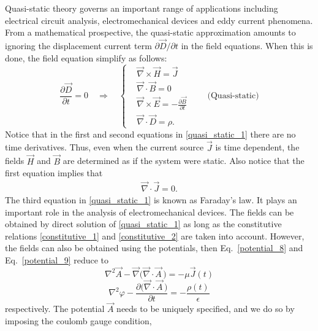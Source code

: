 \documentclass[11pt,a4paper,oneside]{book}
\numberwithin{equation}{section}
\theoremstyle{it}
\theoremstyle{definition}
\begin{document}
Quasi-static theory governs an important range of applications including electrical circuit analysis, electromechanical devices and eddy current phenomena. From a mathematical prospective, the quasi-static approximation amounts to ignoring the displacement current term $\partial \vec{D}/\partial t$ in the field equations. When this is done, the field equation simplify as follows:
\begin{equation}\label{quasi_static_1}
	\frac{\partial\vec{D}}{\partial t} = 0\quad\Rightarrow\quad\left\lbrace 
	\begin{aligned}
		&\vec{\nabla}\times\vec{H}=\vec{J}\\[8pt]
		&\vec{\nabla}\cdot\vec{B}=0\\[8pt]
		&\vec{\nabla}\times\vec{E}=-\frac{\partial\vec{B}}{\partial t}\\[8pt]
		&\vec{\nabla}\cdot\vec{D}=\rho.
	\end{aligned}\right. \qquad\text{(Quasi-static)}
\end{equation}
Notice that in the first and second equations in \ref{quasi_static_1} there are no time derivatives. Thus, even when the current source $\vec{J}$ is time dependent, the fields $\vec{H}$ and $\vec{B}$ are determined as if the system were static. Also notice that the first equation implies that
\begin{equation*}\label{}
	\begin{aligned}
		\vec{\nabla}\cdot\vec{J}=0.
	\end{aligned}
\end{equation*}
The third equation in \ref{quasi_static_1} is known as Faraday's law. It plays an important role in the analysis of electromechanical devices. The fields can be obtained by direct solution of \ref{quasi_static_1} as long as the constitutive relations \ref{constitutive_1} and \ref{constitutive_2} are taken into account. However, the fields can also be obtained using the potentials, then Eq.~\eqref{potential_8} and Eq.~\eqref{potential_9} reduce to 
\begin{equation}\label{quasi_static_2}
	\nabla^2\vec{A} - \vec{\nabla}\big(\vec{\nabla}\cdot\vec{A}\,\big) = -\mu\vec{J}(t)
\end{equation}
\begin{equation}\label{quasi_static_3}
	\nabla^2\varphi - \frac{\partial \big(\vec{\nabla}\cdot\vec{A}\,\big)}{\partial t} = -\frac{\rho(t)}{\epsilon}
\end{equation}
respectively. The potential $\vec{A}$ needs to be uniquely specified, and we do so by imposing the coulomb gauge condition,
\end{document}
